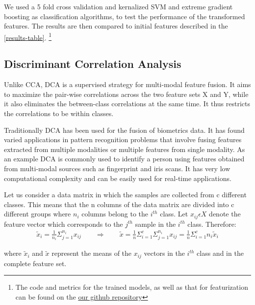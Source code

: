 \documentclass{article}
\begin{document}

We used a 5 fold cross validation and kernalized SVM and extreme gradient boosting as classification algorithms, to test the performance of the transformed features. The results are then compared to initial features described in the \ref{results-table}. \footnote{The code and metrics for the trained models, as well as that for featurization can be found on the \href{https://github.com/mridul/project-adv-ml}{our github repository}}

\subsection{Discriminant Correlation Analysis}
Unlike CCA, DCA \cite{dca} is a supervised strategy for multi-modal feature fusion. It aims to maximize the pair-wise correlations across the two feature sets X and Y, while it also eliminates the between-class correlations at the same time. It thus restricts the correlations to be within classes.

Traditionally DCA has been used for the fusion of biometrics data. It has found varied applications in pattern recognition problems that involve fusing features extracted from multiple modalities or multiple features from single modality. As an example DCA is commonly used to identify a person using features obtained from multi-modal sources such as fingerprint and iris scans. It has very low computational complexity and can be easily used for real-time applications. 

Let us consider a data matrix in which the samples are collected from c different classes. This means that the n columns of the data matrix are divided into c different groups where $n_i$ columns belong to the $i^{th}$ class. Let $x_{ij}\epsilon X$ denote the feature vector which corresponds to the $j^{th}$ sample in the $i^{th}$ class. Therefore:
\begin{gather*}
  \tilde{x}_i = \frac{1}{n_i}\Sigma_{j=1}^{n_i}x_{ij} \qquad\text{$\Rightarrow$}\qquad \tilde{x} = \frac{1}{n}\Sigma_{i=1}^c\Sigma_{j=1}^{n_i}x_{ij} = \frac{1}{n}\Sigma_{i=1}^{c}n_{i}\tilde{x}_i
\end{gather*}

where $\tilde{x}_i$ and $\tilde{x}$ represent the means of the $x_{ij}$ vectors in the $i^{th}$ class and in the complete feature set.
\end{document}
